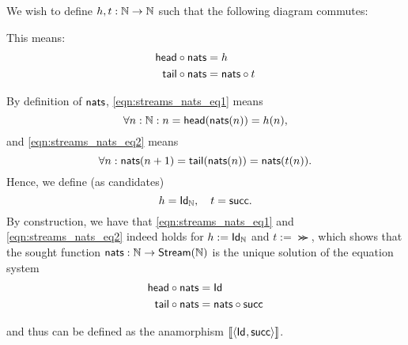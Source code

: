\begin{solution}\label{sol:stream-of-nats}

	We wish to define $h,t : \NN\to \NN$ such that the following diagram commutes:
	\begin{center}
	\end{center}
	
	This means:
	\begin{align}
	\co{\nats}{\head} &= h \label{eqn:streams_nats_eq1} \\
	\co{\nats}{\tail} &= \co{t}{\nats} \label{eqn:streams_nats_eq2} 
	\end{align}
	
	By definition of $\nats$, \cref{eqn:streams_nats_eq1} means
	\[
	\forall n : \NN: n = \head(\nats(n)) = h(n),
	\]
	and \cref{eqn:streams_nats_eq2} means
	\[
	\forall n : \nats(n+1) = \tail(\nats(n)) = \nats(t(n)).
	\]
	Hence, we define (as candidates)
	\[
	h = \Id[\NN], \quad t = \Succ.
	\]
	By construction, we have that \cref{eqn:streams_nats_eq1} and \cref{eqn:streams_nats_eq2} indeed holds for $h := \Id[\NN]$ and $t := \Succ$, which shows that the sought function $\nats : \NN \to \Stream(\NN)$ is the unique solution of the equation system
  \begin{align*}
    \co {\nats} \head  &= \Id
    \\
    \co {\nats} \tail &= \co \Succ {\nats}
  \end{align*}  
  
  and thus can be defined as the anamorphism $\anam{ \langle \Id, \Succ \rangle }$.
\end{solution}

